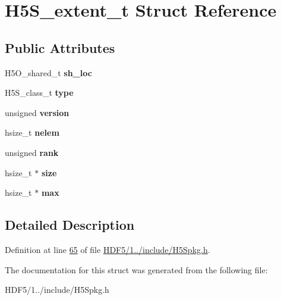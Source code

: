 \hypertarget{struct_h5_s__extent__t}{}\section{H5\+S\+\_\+extent\+\_\+t Struct Reference}
\label{struct_h5_s__extent__t}
\subsection*{Public Attributes}
\begin{DoxyCompactItemize}
\item 
\mbox{\label{struct_h5_s__extent__t_ad18b6ae79a40984bf2d4ed765f075440}} 
H5\+O\+\_\+shared\+\_\+t {\bfseries sh\+\_\+loc}
\item 
\mbox{\label{struct_h5_s__extent__t_a66bbf55b9f4ef8eaa4c7dcfa28a78993}} 
H5\+S\+\_\+class\+\_\+t {\bfseries type}
\item 
\mbox{\label{struct_h5_s__extent__t_a1e6437f010a65af2960d6d62f2ffffde}} 
unsigned {\bfseries version}
\item 
\mbox{\label{struct_h5_s__extent__t_a265332a7b7f4536955554d0ac8d1e1e2}} 
hsize\+\_\+t {\bfseries nelem}
\item 
\mbox{\label{struct_h5_s__extent__t_a406e60cb2196235a5cd4b724262e7ad3}} 
unsigned {\bfseries rank}
\item 
\mbox{\label{struct_h5_s__extent__t_a55dd10518b7ad69e11eaa4a3002f56e7}} 
hsize\+\_\+t $\ast$ {\bfseries size}
\item 
\mbox{\label{struct_h5_s__extent__t_afcf344ceebf63cd8c4d2cbd0b5b7c1d6}} 
hsize\+\_\+t $\ast$ {\bfseries max}
\end{DoxyCompactItemize}


\subsection{Detailed Description}


Definition at line \hyperlink{_h_d_f5_21_810_81_2include_2_h5_spkg_8h_source_l00065}{65} of file \hyperlink{_h_d_f5_21_810_81_2include_2_h5_spkg_8h_source}{H\+D\+F5/1../include/\+H5\+Spkg.\+h}.



The documentation for this struct was generated from the following file\+:\begin{DoxyCompactItemize}
\item 
H\+D\+F5/1../include/\+H5\+Spkg.\+h\end{DoxyCompactItemize}
